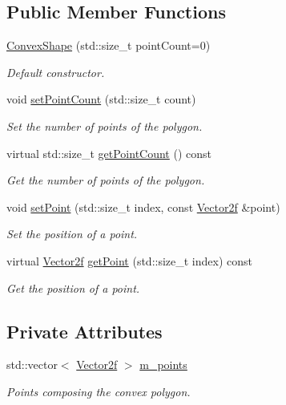 \subsection*{Public Member Functions}
\begin{DoxyCompactItemize}
\item 
\mbox{\hyperlink{classsf_1_1_convex_shape_af9981b8909569b381b3fccf32fc69856}{Convex\+Shape}} (std\+::size\+\_\+t point\+Count=0)
\begin{DoxyCompactList}\small\item\em Default constructor. \end{DoxyCompactList}\item 
void \mbox{\hyperlink{classsf_1_1_convex_shape_a56e6e79ade6dd651cc1a0e39cb68deae}{set\+Point\+Count}} (std\+::size\+\_\+t count)
\begin{DoxyCompactList}\small\item\em Set the number of points of the polygon. \end{DoxyCompactList}\item 
virtual std\+::size\+\_\+t \mbox{\hyperlink{classsf_1_1_convex_shape_a0c54b8d48fe4e13414f6e667dbfc22a3}{get\+Point\+Count}} () const
\begin{DoxyCompactList}\small\item\em Get the number of points of the polygon. \end{DoxyCompactList}\item 
void \mbox{\hyperlink{classsf_1_1_convex_shape_a5929e0ab0ba5ca1f102b40c234a8e92d}{set\+Point}} (std\+::size\+\_\+t index, const \mbox{\hyperlink{classsf_1_1_vector2}{Vector2f}} \&point)
\begin{DoxyCompactList}\small\item\em Set the position of a point. \end{DoxyCompactList}\item 
virtual \mbox{\hyperlink{classsf_1_1_vector2}{Vector2f}} \mbox{\hyperlink{classsf_1_1_convex_shape_a72a97bc426d8daf4d682a20fcb7f3fe7}{get\+Point}} (std\+::size\+\_\+t index) const
\begin{DoxyCompactList}\small\item\em Get the position of a point. \end{DoxyCompactList}\end{DoxyCompactItemize}
\subsection*{Private Attributes}
\begin{DoxyCompactItemize}
\item 
\mbox{\label{classsf_1_1_convex_shape_aaef41d63013c3978518a95125cca9cdd}} 
std\+::vector$<$ \mbox{\hyperlink{classsf_1_1_vector2}{Vector2f}} $>$ \mbox{\hyperlink{classsf_1_1_convex_shape_aaef41d63013c3978518a95125cca9cdd}{m\+\_\+points}}
\begin{DoxyCompactList}\small\item\em Points composing the convex polygon. \end{DoxyCompactList}\end{DoxyCompactItemize}
